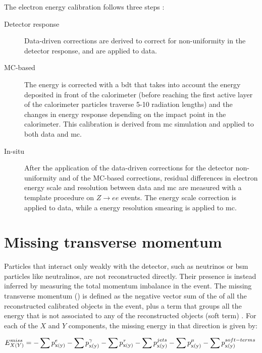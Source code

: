 The electron energy calibration follows three steps \cite{Aad:2014nim,ATL-PHYS-PUB-2016-015}:
\begin{description}
\item[Detector response] Data-driven corrections are derived to correct for non-uniformity in the detector response, and are applied to data.
 
\item[MC-based] The energy is corrected with a \gls{bdt} that takes into account the energy deposited in front of the calorimeter (before reaching the first active layer of the calorimeter particles traverse 5-10 radiation lengths) and the changes in energy response depending on the impact point in the calorimeter.
This calibration is derived from \gls{mc} simulation and applied to both data and \gls{mc}. 

\item[In-situ] After the application of the data-driven corrections for the detector non-uniformity and of the MC-based corrections, 
residual differences in electron energy scale and resolution between data and \gls{mc} are measured with a template procedure on $Z\rightarrow e e$ events. The energy scale correction is applied to data, while a energy resolution smearing is applied to \gls{mc}.

\end{description}



\section{Missing transverse momentum}
\label{sec:met}

Particles that interact only weakly with the detector, such as neutrinos or \gls{bsm} particles like neutralinos, are not reconstructed directly.  
Their presence is instead inferred by measuring the total momentum imbalance in the event. 
The missing transverse momentum (\met) is defined as the negative vector sum of the \pt of all the reconstructed calibrated objects in the event, 
plus a term that groups all the energy that is not associated to any of the reconstructed objects (soft term) \cite{Aad:2016nrq}. 
For each of the $X$ and $Y$ components, the missing energy in that direction is given by:

\begin{equation}
E_{X(Y)}^{miss} =  - \sum p_\mathrm{x(y)} ^{e}  - \sum p_\mathrm{x(y)} ^{\gamma} - \sum p_\mathrm{x(y)} ^{\tau}    \nonumber \\
- \sum p_\mathrm{x(y)} ^{jets} - \sum p_\mathrm{x(y)}   ^{\mu} - \sum p_\mathrm{x(y)}  ^{soft-terms}   \;
\label{eq:etm} 
\end{equation}

